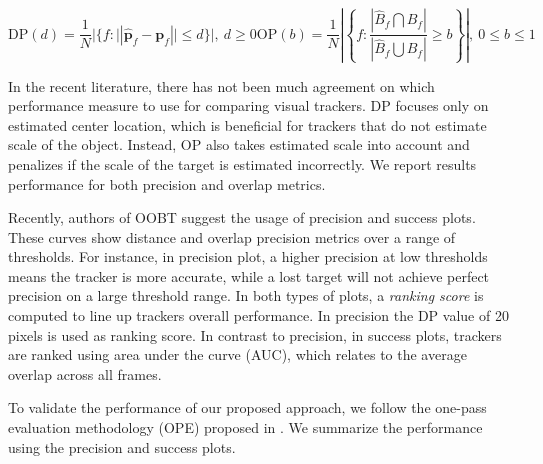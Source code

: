 \begin{subequations}
\begin{equation}
	\mathrm{DP}(d) = \frac{1}{N}|\{f:||\mathbf{\hat{p}}_f - \mathbf{p}_f|| \leq d\}|,\:d\geq 0
\label{eq::precision}
\end{equation}

\begin{equation}
	\mathrm{OP}(b) = \frac{1}{N}\left | \left \{ f: \frac{|\hat{B}_f \bigcap B_f|}
										{|\hat{B}_f \bigcup  B_f|}
	 \geq b \right \} \right |,\:0 \leq b\leq 1
\label{eq::overlap}
\end{equation}
\end{subequations}

In the recent literature, there has not been much agreement on which
performance measure to use for comparing visual trackers. DP focuses only
on estimated center location, which is beneficial for trackers that do not
estimate scale of the object. Instead, OP also takes estimated scale into
account and penalizes if the scale of the target is estimated incorrectly. We report results performance for both precision and overlap metrics.

Recently, authors of OOBT suggest the usage of precision and success plots.
These curves show distance and overlap precision metrics over a range of
thresholds. For instance, in precision plot, a higher precision at low
thresholds means the tracker is more accurate, while a lost target will not
achieve perfect precision on a large threshold range. In both types of plots,
a \textit{ranking score} is computed to line up trackers overall performance.
In precision the DP value of 20 pixels is used as ranking score. In contrast to precision, in success plots, trackers are ranked using area under
the curve (AUC), which relates to the average overlap across all frames. 

To validate the performance of our proposed approach, we follow the one-pass
evaluation methodology (OPE) proposed in \cite{Wu2013}. 
We summarize the performance using the precision and success plots.

